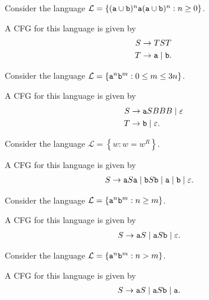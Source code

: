 \documentclass{notes}
\begin{document}
\begin{eg}
  Consider the language $\mathcal L = \left \{ (\verb~a~ \cup \verb~b~)^n \verb~a~ (\verb~a~ \cup \verb~b~)^n : n \geq 0 \right \}$.
  
  A CFG for this language is given by
  \begin{align*}
    S &\to T S T \\ 
    T &\to \verb~a~ \; | \; \verb~b~.
  \end{align*}
\end{eg}

\begin{eg}
  Consider the language $\mathcal L = \left \{ \verb~a~^n \verb~b~^m : 0 \leq m \leq 3 n \right \}$.

  A CFG for this language is given by
  \begin{align*}
    S &\to \verb~a~ S B B B \; | \; \varepsilon \\ 
    T &\to \verb~b~ \; | \; \varepsilon.
  \end{align*}
\end{eg}

\begin{eg}
  Consider the language $\mathcal L = \left \{ w : w = w^R \right \}$.
  
  A CFG for this language is given by
  \begin{align*}
    S &\to \verb~a~ S \verb~a~ \; | \; \verb~b~ S \verb~b~ \; | \; \verb~a~ \; | \; \verb~b~ \; | \; \varepsilon.
  \end{align*}
\end{eg}

\begin{eg}
  Consider the language $\mathcal L = \left \{ \verb~a~^n \verb~b~^m : n \geq m \right \}$.
  
  A CFG for this language is given by 
  \begin{align*}
    S &\to \verb~a~ S \; | \; \verb~a~ S \verb~b~ \; | \; \varepsilon.
  \end{align*}
\end{eg}

\begin{eg}
  Consider the language $\mathcal L = \left \{ \verb~a~^n \verb~b~^m : n > m \right \}$.
  
  A CFG for this language is given by 
  \begin{align*}
    S &\to \verb~a~ S \; | \; \verb~a~ S \verb~b~ \; | \; \verb~a~.
  \end{align*}
\end{eg}
\end{document}
